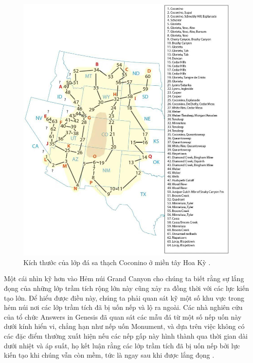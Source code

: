 \documentclass[10pt,twocolumn,letterpaper]{article}
\begin{document}
\begin{figure}[t]

\begin{center}
   \includegraphics[width=1\linewidth]{coconino.jpg}
\end{center}
   \caption{Kích thước của lớp đá sa thạch Coconino ở miền tây Hoa Kỳ \cite{21}.}
\label{fig:3}
\label{fig:onecol}
\end{figure}

Một cái nhìn kỹ hơn vào Hẻm núi Grand Canyon cho chúng ta biết rằng sự lắng đọng của những lớp trầm tích rộng lớn này cũng xảy ra đồng thời với các lực kiến tạo lớn. Để hiểu được điều này, chúng ta phải quan sát kỹ một số khu vực trong hẻm núi nơi các lớp trầm tích đã bị uốn nếp và lộ ra ngoài. Các nhà nghiên cứu của tổ chức Answers in Genesis \cite{42} đã quan sát các mẫu đá từ một số nếp uốn này dưới kính hiển vi, chẳng hạn như nếp uốn Monument, và dựa trên việc không có các đặc điểm thường xuất hiện nếu các nếp gấp này hình thành qua thời gian dài dưới nhiệt và áp suất, họ kết luận rằng các lớp trầm tích đã bị uốn nếp bởi lực kiến tạo khi chúng vẫn còn mềm, tức là ngay sau khi được lắng đọng \cite{43}.
\end{document}
